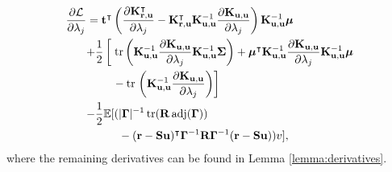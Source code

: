 \documentclass{mpaper}
\DeclareMathOperator{\adj}{adj}
\DeclareMathOperator{\tr}{tr}
\newcommand{\Kuu}{\mathbf{K}_{\mathbf{u},\mathbf{u}}}
\newcommand{\Kru}{\mathbf{K}_{\mathbf{r},\mathbf{u}}}
\begin{document}
\begin{align*}
  \frac{\partial \mathcal{L}}{\partial \lambda_j} &=
  \mathbf{t}^\intercal \left( \frac{\partial \Kru^\intercal}{\partial
      \lambda_j} - \Kru^\intercal\Kuu^{-1}\frac{\partial
      \Kuu}{\partial \lambda_j} \right) \Kuu^{-1} \bm\mu \\
  &\begin{aligned}
    + \frac{1}{2} \left[ \vphantom{\frac{\partial \Kuu}{\partial \lambda_j}}
    \right. &\tr \left( \Kuu^{-1} \frac{\partial \Kuu}{\partial \lambda_j}
      \Kuu^{-1} \bm\Sigma \right) + \bm\mu^\intercal \Kuu^{-1} \frac{\partial
      \Kuu}{\partial \lambda_j} \Kuu^{-1} \bm\mu \\
    &- \tr \left. \left(\Kuu^{-1} \frac{\partial \Kuu}{\partial \lambda_j}
      \right) \right]
  \end{aligned} \\
  &\begin{aligned}
    - \frac{1}{2} \mathbb{E} [ (&|\bm\Gamma|^{-1} \tr(\mathbf{R} \adj(\bm\Gamma)) \\
    &- (\mathbf{r} - \mathbf{Su})^\intercal\bm\Gamma^{-1}\mathbf{R}\bm\Gamma^{-1}(\mathbf{r} - \mathbf{Su})) v],
  \end{aligned} 
\end{align*}
where the remaining derivatives can be found in Lemma \ref{lemma:derivatives}.
\end{document}
